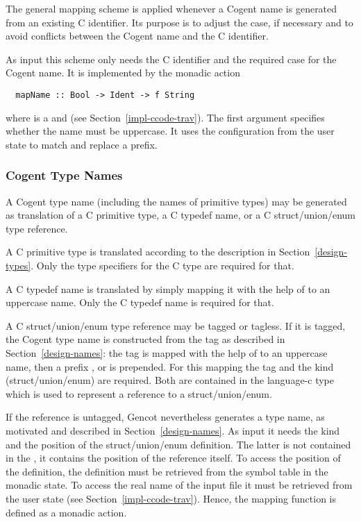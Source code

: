 The general mapping scheme is applied whenever a Cogent name is generated from an existing C identifier.
Its purpose is to adjust the case, if necessary and to avoid conflicts between the Cogent name and
the C identifier.

As input this scheme only needs the C identifier and the required case for the Cogent name.
It is implemented by the monadic action
\begin{verbatim}
  mapName :: Bool -> Ident -> f String
\end{verbatim}
where  is a  and  
(see Section~\ref{impl-ccode-trav}). The first argument specifies whether the name must be uppercase. 
It uses the configuration from the user state to match and replace a prefix.

\subsubsection{Cogent Type Names}

A Cogent type name (including the names of primitive types) may be generated as translation of a C 
primitive type, a C typedef name, or a C struct/union/enum type reference. 

A C primitive type is translated according to the description in Section~\ref{design-types}. Only the
type specifiers for the C type are required for that.

A C typedef name is translated by simply mapping it with the help of  to an uppercase name.
Only the C typedef name is required for that.

A C struct/union/enum type reference may be tagged or tagless. If it is tagged, the Cogent type name is
constructed from the tag as described in Section~\ref{design-names}: the tag is mapped with the help of
 to an uppercase name, then a prefix ,  or  is 
prepended. For this mapping the tag and the kind (struct/union/enum) are required. Both are contained
in the language-c type  which is used to represent a reference to a struct/union/enum.

If the reference is untagged, Gencot nevertheless generates a type name, as motivated and described 
in Section~\ref{design-names}. As input it needs the kind and the position of the struct/union/enum 
definition. The latter is not contained in the , it contains the position of the reference
itself. To access the position of the definition, the definition must be retrieved from the symbol table
in the monadic state. To access the real name of the input file it must be retrieved from the user
state (see Section~\ref{impl-ccode-trav}). Hence, the mapping function is defined as a monadic action. 

